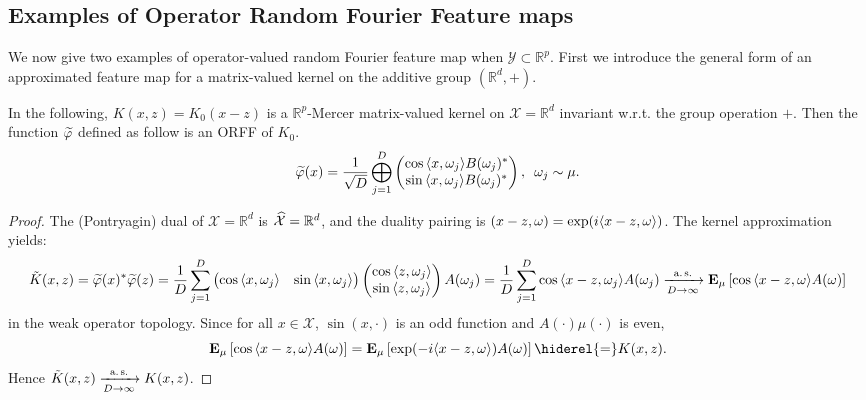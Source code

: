 \subsection{Examples of Operator Random Fourier Feature maps}
We now give two examples of operator-valued random Fourier feature map when $\mathcal{Y}\subset\mathbb{R}^p$. First we introduce the general form of an approximated feature map for a matrix-valued kernel on the additive group $(\mathbb{R}^d,+)$.
\begin{example}\label{ex:additive_group}
In the following, $K(x,z)=K_0(x-z)$ is a $\mathbb{R}^p$-Mercer matrix-valued kernel on $\mathcal{X}=\mathbb{R}^d$ invariant w.r.t. the group operation $+$. %
Then the function $\tildePhi{1:D}$ defined as follow is an \acl{ORFF} of $K_{0}$.
\begin{equation*}
\begin{aligned}
\tildePhi{1:D}(x)=\frac{1}{\sqrt{D}}\Vect_{j=1}^D\begin{pmatrix}\cos{\inner{x,\omega_j}}B(\omega_j)^\adjoint  \\ \sin{\inner{x,\omega_j}}B(\omega_j)^\adjoint \end{pmatrix}, \enskip \omega_j \sim \mu.
\end{aligned}
\end{equation*}
\end{example}
\begin{proof}
The (Pontryagin) dual of $\mathcal{X}=\mathbb{R}^d$
is $\widehat{\mathcal{X}}=\mathbb{R}^d$, and the duality pairing is $(x-z,\omega)=\exp(i\langle x-z, \omega\rangle)$. The kernel approximation yields:
\begin{dmath*}
\tilde{K}(x,z)=\tildePhi{1:D}(x)^\adjoint \tildePhi{1:D}(z)
= \frac{1}{D} \sum_{j=1}^D \begin{pmatrix} \cos{\inner{x,\omega_j}} & \sin{\inner{x,\omega_j}} \end{pmatrix}\begin{pmatrix}\cos{\inner{z,\omega_j}} \\ \sin{\inner{z,\omega_j}} \end{pmatrix} A(\omega_j)
= \frac{1}{D} \sum_{j=1}^D \cos{\inner{x-z,\omega_j}}A(\omega_j) \\
\converges{\asurely}{D\to\infty}\expectation_\mu\left[\cos{\inner{x-z,\omega}}A(\omega)\right]
\end{dmath*}
in the weak operator topology. Since for all $x\in\mathcal{X}$, $\sin(x, \cdot)$ is an odd function and $A(\cdot)\mu(\cdot)$ is even,
\begin{dmath*}
\expectation_\mu\left[\cos{\inner{x-z,\omega}}A(\omega)\right]=\expectation_\mu\left[\exp(-i\inner{x-z,\omega})A(\omega)\right]\hiderel{=}K(x,z).
\end{dmath*}
Hence $\tilde{K}(x,z)\xrightarrow[D\to\infty]{\text{a.\,s.}}K(x,z)$.
\end{proof}
